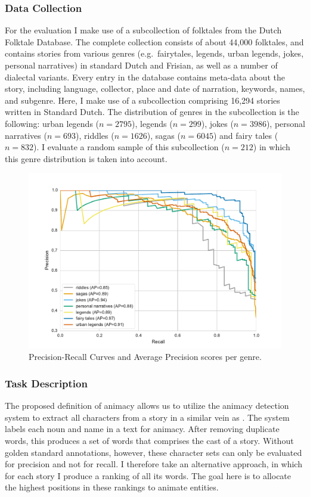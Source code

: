 \subsubsection{Data Collection}
For the evaluation I make use of a subcollection of folktales from the Dutch Folktale Database. The complete collection consists of about 44,000 folktales\autocite{meder:2010,meder:2016}, and contains stories from various genres (e.g.\ fairytales, legends, urban legends, jokes, personal narratives) in standard Dutch and Frisian, as well as a number of dialectal variants. Every entry in the database contains meta-data about the story, including language, collector, place and date of narration, keywords, names, and subgenre. Here, I make use of a subcollection comprising 16,294 stories written in Standard Dutch. The distribution of genres in the subcollection is the following: urban legends ($n=2795$), legends ($n=299$), jokes ($n=3986$), personal narratives ($n=693$), riddles ($n=1626$), sagas ($n=6045$) and fairy tales ($n=832$). I evaluate a random sample of this subcollection ($n=212$) in which this genre distribution is taken into account.

\begin{figure}
\centering
\includegraphics[width=\textwidth]{images/precision-recall-curve}
\caption{Precision-Recall Curves and Average Precision scores per genre.}
\label{fig:prec-recall-curve}
\end{figure}

\subsubsection{Task Description}
The proposed definition of animacy allows us to utilize the animacy detection system to extract all characters from a story in a similar vein as \citeauthor{karsdorp:2012b}.\autocite{karsdorp:2012b} The system labels each noun and name in a text for animacy. After removing duplicate words, this produces a set of words that comprises the cast of a story. Without golden standard annotations, however, these character sets can only be evaluated for precision and not for recall. I therefore take an alternative approach, in which for each story I produce a ranking of all its words. The goal here is to allocate the highest positions in these rankings to animate entities. 

